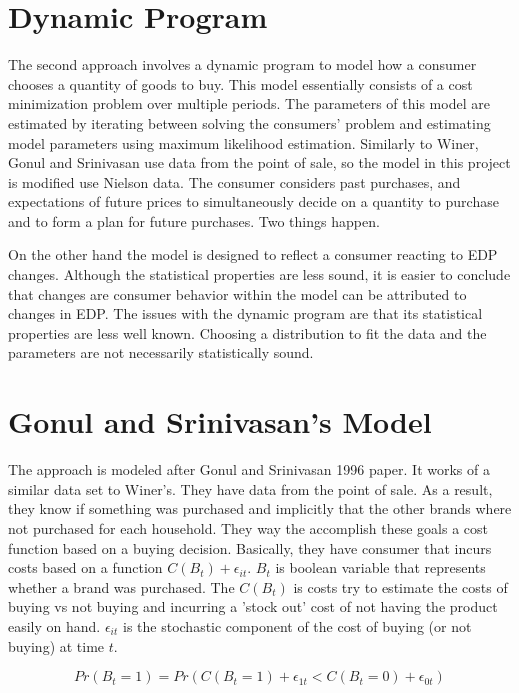 \documentclass{article}
\begin{document}
\section{Dynamic Program}


The second approach involves a dynamic program to model how a consumer chooses a quantity of goods to buy. This model essentially consists of a cost minimization problem over multiple periods. 
The parameters of this model are estimated by iterating between solving the consumers' problem and estimating model parameters using maximum likelihood estimation. Similarly to Winer, Gonul and Srinivasan use data from the point of sale, so the model in this project is modified use Nielson data. The consumer considers past purchases, and expectations of future prices to simultaneously decide on a quantity to purchase and to form a plan for future purchases. Two things happen.


On the other hand the model is designed to reflect a consumer reacting to EDP changes. Although the statistical properties are less sound, it is easier to conclude that changes are consumer behavior within the model can be attributed to changes in EDP. The issues with the dynamic program are that its statistical properties are less well known. Choosing a distribution to fit the data and the parameters are not necessarily statistically sound.


\section{Gonul and Srinivasan's Model}


The approach is modeled after Gonul and Srinivasan 1996 paper\cite{gonul}. It works of a similar data set to Winer's. They have data from the point of sale. As a result, they know if something was purchased and implicitly that the other brands where not purchased for each household. They way the accomplish these goals a cost function based on a buying decision. Basically, they have consumer that incurs costs based on a function $C(B_t) + \epsilon_{it}$. $B_t$ is boolean variable that represents whether a brand was purchased. The $C(B_t)$ is costs try to estimate the costs of buying vs not buying and incurring a 'stock out' cost of not having the product easily on hand. $\epsilon_{it}$ is the stochastic component of the cost of buying (or not buying)
at time $t$.

$$Pr(B_t=1) = Pr(C(B_t = 1) + \epsilon_{1t} < C(B_t = 0) + \epsilon_{0t} )$$ 
\end{document}
